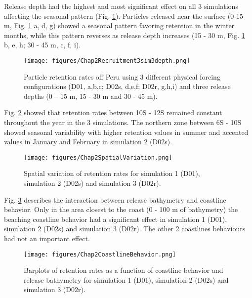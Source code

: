 Release depth had the highest and most significant effect on all 3 simulations affecting the seasonal pattern (Fig. \ref{Chap2Recruitment3sim3depth}). Particles released near the surface (0-15 m, Fig. \ref{Chap2Recruitment3sim3depth} a, d, g) showed a seasonal pattern favoring retention in the winter months, while this pattern reverses as release depth increases (15 - 30 m, Fig. \ref{Chap2Recruitment3sim3depth} b, e, h; 30 - 45 m, c, f, i).\\

\begin{figure}[ht]
	\texttt{[image: figures/Chap2Recruitment3sim3depth.png]}
	\centering
	\caption{Particle retention rates off Peru using 3 different physical forcing configurations (D01, a,b,c; D02s, d,e,f; D02r, g,h,i) and three release depths (0 – 15 m, 15 - 30 m and 30 - 45 m).}
	\label{Chap2Recruitment3sim3depth}
\end{figure}

Fig. \ref{Chap2SpatialVariation} showed that retention rates between 10\textdegree S - 12\textdegree S remained constant throughout the year in the 3 simulations. The northern zone between 6\textdegree S - 10\textdegree S showed seasonal variability with higher retention values in summer and accented values in January and February in simulation 2 (D02s).\\

\begin{figure}[ht]
	\texttt{[image: figures/Chap2SpatialVariation.png]}
	\centering
	\caption{Spatial variation of retention rates for simulation 1 (D01), simulation 2 (D02s) and simulation 3 (D02r).}
	\label{Chap2SpatialVariation}
\end{figure}

Fig. \ref{Chap2CoastlineBehavior} describes the interaction between release bathymetry and coastline behavior. Only in the area closest to the coast (0 - 100 m of bathymetry) the beaching coastline behavior had a significant effect in simulation 1 (D01), simulation 2 (D02s) and simulation 3 (D02r). The other 2 coastlines behaviours had not an important effect.\\

\begin{figure}[ht]
	\texttt{[image: figures/Chap2CoastlineBehavior.png]}
	\centering
	\caption{Barplots of retention rates as a function of coastline behavior and release bathymetry for simulation 1 (D01), simulation 2 (D02s) and simulation 3 (D02r).}
	\label{Chap2CoastlineBehavior}
\end{figure}

